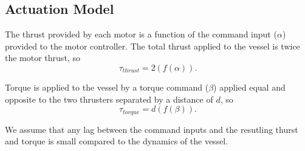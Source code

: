 \documentclass[11pt,draftcls,journal,onecolumn]{IEEEtran}
\begin{document}
\subsection{Actuation Model}
The thrust provided by each motor is a function of the command input ($\alpha$) provided to the motor controller.  The total thrust applied to the vessel is twice the motor thrust, so
\begin{equation}
\tau_{thrust}= 2 (f(\alpha)).
\label{e:thrust}
\end{equation}

Torque is applied to the vessel by a torque command ($\beta$) applied equal and opposite to the two thrusters separated by a distance of $d$, so
\begin{equation}
\tau_{torque}= d (f(\beta)).
\label{e:torque}
\end{equation}

We assume that any lag between the command inputs and the resutling thurst and torque is small compared to the dynamics of the vessel.
\end{document}

